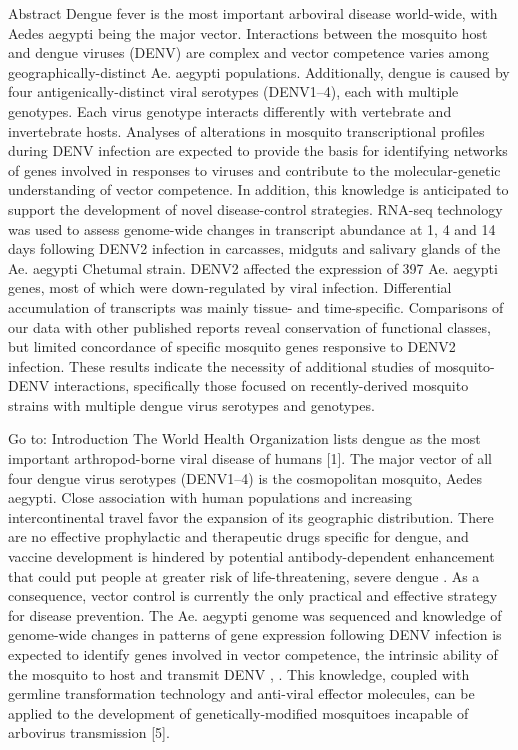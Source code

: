  Abstract
Dengue fever is the most important arboviral disease world-wide, with Aedes aegypti being the major vector.
Interactions between the mosquito host and dengue viruses (DENV) are complex and vector competence varies among geographically-distinct Ae. aegypti populations.
Additionally, dengue is caused by four antigenically-distinct viral serotypes (DENV1–4), each with multiple genotypes.
Each virus genotype interacts differently with vertebrate and invertebrate hosts.
Analyses of alterations in mosquito transcriptional profiles during DENV infection are expected to provide the basis for identifying networks of genes involved in responses to viruses and contribute to the molecular-genetic understanding of vector competence.
In addition, this knowledge is anticipated to support the development of novel disease-control strategies.
RNA-seq technology was used to assess genome-wide changes in transcript abundance at 1, 4 and 14 days following DENV2 infection in carcasses, midguts and salivary glands of the Ae. aegypti Chetumal strain.
DENV2 affected the expression of 397 Ae. aegypti genes, most of which were down-regulated by viral infection.
Differential accumulation of transcripts was mainly tissue- and time-specific.
Comparisons of our data with other published reports reveal conservation of functional classes, but limited concordance of specific mosquito genes responsive to DENV2 infection.
These results indicate the necessity of additional studies of mosquito-DENV interactions, specifically those focused on recently-derived mosquito strains with multiple dengue virus serotypes and genotypes.

Go to:
Introduction
The World Health Organization lists dengue as the most important arthropod-borne viral disease of humans [1].
The major vector of all four dengue virus serotypes (DENV1–4) is the cosmopolitan mosquito, Aedes aegypti.
Close association with human populations and increasing intercontinental travel favor the expansion of its geographic distribution.
There are no effective prophylactic and therapeutic drugs specific for dengue, and vaccine development is hindered by potential antibody-dependent enhancement that could put people at greater risk of life-threatening, severe dengue \cite{Gubler2002}.
As a consequence, vector control is currently the only practical and effective strategy for disease prevention.
The Ae. aegypti genome was sequenced and knowledge of genome-wide changes in patterns of gene expression following DENV infection is expected to identify genes involved in vector competence, the intrinsic ability of the mosquito to host and transmit DENV \cite{Nene2007}, \cite{Kramer2003}.
This knowledge, coupled with germline transformation technology and anti-viral effector molecules, can be applied to the development of genetically-modified mosquitoes incapable of arbovirus transmission [5]\cite{Franz2006}\cite{Mathur2010}.


